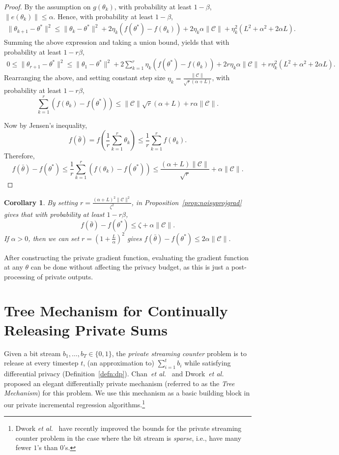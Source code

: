 \documentclass{article}
\theoremstyle{plain}
\newtheorem{corollary}[theorem]{Corollary}
\def \CCC {\mathcal{C}}
\begin{document}
\begin{proof}
By the assumption on $g(\theta_k)$, with probability at least $1-\beta$, $\| e(\theta_k) \| \leq \alpha$. Hence, with probability at least $1-\beta$,
\begin{align*}
\| \theta_{k+1} - \theta^{\ast} \|^2 \leq \| \theta_k -  \theta^\ast \|^2 + 2 \eta_k (f(\theta^\ast) - f(\theta_k)) + 2 \eta_k \alpha \| \CCC \| + \eta_k^2 ( L^2 + \alpha^2 + 2\alpha L).
\end{align*}
Summing the above expression and taking a union bound, yields that with probability at least $1-r\beta$,
\begin{align*}
0 \leq \| \theta_{r+1} - \theta^\ast \|^2 \leq \| \theta_1 - \theta^\ast \|^2 + 2 \sum_{k=1}^r \eta_k (f(\theta^\ast) - f(\theta_k))  + 2 r \eta_k \alpha  \| \CCC \| + r \eta_k^2 ( L^2 + \alpha^2 + 2\alpha L).
\end{align*}
Rearranging the above, and setting constant step size $\eta_k = \frac{\| \CCC \|}{\sqrt{r}(\alpha+L)}$, with probability at least $1-r\beta$,
$$\sum_{k=1}^r (f(\theta_k) - f(\theta^\ast)) \leq  \| \CCC \| \sqrt{r}(\alpha+L)  + r \alpha \| \CCC \|.$$

Now by Jensen's inequality, 
$$f(\bar{\theta}) = f \left ( \frac{1}{r} \sum_{k=1}^r \theta_k \right ) \leq \frac{1}{r} \sum_{k=1}^r f(\theta_k).$$
Therefore,
$$f(\bar{\theta}) - f(\theta^\ast) \leq \frac{1}{r} \sum_{k=1}^r (f(\theta_k) - f(\theta^\ast))  \leq \frac{(\alpha+L) \| \CCC \| }{\sqrt{r}}  + \alpha \| \CCC \|.$$
\end{proof}

\begin{corollary} \label{cor:noisyprojgrad}
By setting $r=\frac{(\alpha+L)^2 \| \CCC \|^2}{\zeta^2}$, in Proposition~\ref{prop:noisyprojgrad} gives that with probability at least $1-r\beta$, 
$$f(\bar{\theta}) - f(\theta^\ast) \leq \zeta + \alpha \| \CCC \|.$$
If $\alpha > 0$, then we can set $r = \left (1+\frac{L}{\alpha} \right)^2$ gives $f(\bar{\theta}) - f(\theta^\ast) \leq 2 \alpha\| \CCC \|$.
\end{corollary}

After constructing the private gradient function, evaluating the gradient function at any $\theta$ can be done without affecting the privacy budget, as this is just a post-processing of private outputs.

\section{Tree Mechanism for Continually Releasing Private Sums}\label{app:treemech}
Given a bit stream $b_1,\dots,b_T \in \{0,1\}$, the {\em private streaming counter} problem is to release at every timestep $t$, (an approximation to) $\sum_{i=1}^t b_i$ while satisfying differential privacy (Definition~\ref{defn:dp}). Chan~\emph{et al.}\ \cite{CSS11} and Dwork~\emph{et al.}\ \cite{DNPR10} proposed an elegant differentially private mechanism (referred to as the \emph{Tree Mechanism}) for this problem. We use this mechanism as a basic building block in our  private incremental regression algorithms.\!\footnote{Dwork \emph{et al.}\ \cite{DNRR15} have recently improved the bounds for the private streaming counter problem in the case where the bit stream is {\em sparse}, i.e., have many fewer $1$'s than $0$'s.}
\end{document}
